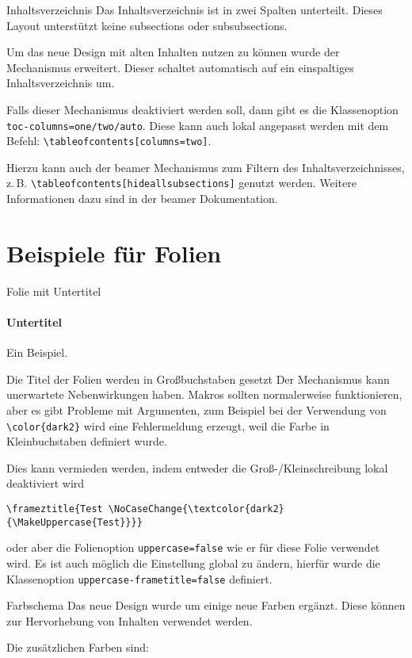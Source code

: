 \documentclass[
	german,%
	accentcolor=9c,%
]{tudabeamer}
\newcommand*{\code}[1]{\texttt{#1}}
\begin{document}
\begin{frame}{Inhaltsverzeichnis}
Das Inhaltsverzeichnis ist in zwei Spalten unterteilt. Dieses Layout unterstützt keine subsections oder subsubsections.

Um das neue Design mit alten Inhalten nutzen zu können wurde der Mechanismus erweitert. Dieser schaltet automatisch auf ein einspaltiges Inhaltsverzeichnis um.

Falls dieser Mechanismus deaktiviert werden soll, dann gibt es die Klassenoption \code{toc-columns=one/two/auto}. Diese kann auch lokal angepasst werden mit dem Befehl:
\code{\textbackslash{}tableofcontents[columns=two]}.

Hierzu kann auch der beamer Mechanismus zum Filtern des Inhaltsverzeichnisses, z.\,B. \code{\textbackslash{}tableofcontents[hideallsubsections]} genutzt werden. Weitere Informationen dazu sind in der beamer Dokumentation.
\end{frame}

\section{Beispiele für Folien}

\begin{frame}{Folie mit Untertitel}
\framesubtitle{Untertitel}
Ein Beispiel.
\end{frame}

\begin{frame}[fragile,uppercase=false]{Die Titel der Folien werden in Großbuchstaben gesetzt}
Der Mechanismus kann unerwartete Nebenwirkungen haben.
Makros sollten normalerweise funktionieren, aber es gibt Probleme mit Argumenten, zum Beispiel bei der Verwendung von \verb+\color{dark2}+ wird eine Fehlermeldung erzeugt, weil die Farbe in Kleinbuchstaben definiert wurde.

Dies kann vermieden werden, indem entweder die Groß-/Kleinschreibung lokal deaktiviert wird
\begin{verbatim}
\frameztitle{Test \NoCaseChange{\textcolor{dark2}{\MakeUppercase{Test}}}}
\end{verbatim}
oder aber die Folienoption \verb+uppercase=false+ wie er für diese Folie  verwendet wird.
Es ist auch möglich die Einstellung global zu ändern, hierfür wurde die Klassenoption \verb+uppercase-frametitle=false+ definiert.
\end{frame}

\begin{frame}{Farbschema}
Das neue Design wurde um einige neue Farben ergänzt. Diese können zur Hervorhebung von Inhalten verwendet werden.

Die zusätzlichen Farben sind:

\renewcommand*{\do}[1]{TUDa-####1: \textcolor{TUDa-####1}{\rule{1cm}{\ht\strutbox}}\par}
\end{frame}
\end{document}
